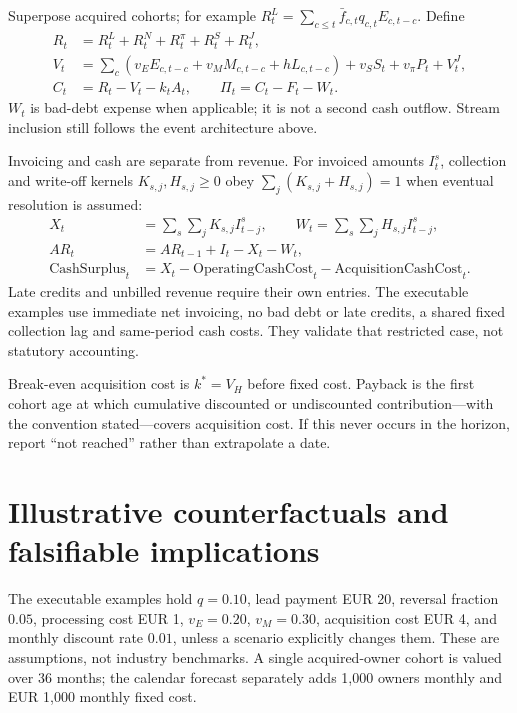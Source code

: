 \documentclass[11pt,a4paper]{article}
\begin{document}
Superpose acquired cohorts; for example $R_t^L=\sum_{c\leq t}\bar f_{c,t}q_{c,t}E_{c,t-c}$. Define
\begin{align}
 R_t&=R_t^{L}+R_t^{N}+R_t^{\pi}+R_t^{S}+R_t^{J},\\
 V_t&=\sum_c(v_EE_{c,t-c}+v_MM_{c,t-c}+hL_{c,t-c})
       +v_SS_t+v_\pi P_t+V_t^{J},\\
 C_t&=R_t-V_t-k_tA_t,\qquad \Pi_t=C_t-F_t-W_t.
\end{align}
$W_t$ is bad-debt expense when applicable; it is not a second cash outflow. Stream inclusion still follows the event architecture above.

Invoicing and cash are separate from revenue. For invoiced amounts $I^s_t$, collection and write-off kernels $K_{s,j},H_{s,j}\geq0$ obey $\sum_j(K_{s,j}+H_{s,j})=1$ when eventual resolution is assumed:
\begin{align}
 X_t&=\sum_s\sum_j K_{s,j}I^s_{t-j},\qquad
 W_t=\sum_s\sum_jH_{s,j}I^s_{t-j},\\
 AR_t&=AR_{t-1}+I_t-X_t-W_t,\\
 \mathrm{CashSurplus}_t&=X_t-\mathrm{OperatingCashCost}_t
                         -\mathrm{AcquisitionCashCost}_t.
\end{align}
Late credits and unbilled revenue require their own entries. The executable examples use immediate net invoicing, no bad debt or late credits, a shared fixed collection lag and same-period cash costs. They validate that restricted case, not statutory accounting.

Break-even acquisition cost is $k^*=V_H$ before fixed cost. Payback is the first cohort age at which cumulative discounted or undiscounted contribution---with the convention stated---covers acquisition cost. If this never occurs in the horizon, report ``not reached'' rather than extrapolate a date.

\section{Illustrative counterfactuals and falsifiable implications}

The executable examples hold $q=0.10$, lead payment EUR 20, reversal fraction $0.05$, processing cost EUR 1, $v_E=0.20$, $v_M=0.30$, acquisition cost EUR 4, and monthly discount rate $0.01$, unless a scenario explicitly changes them. These are assumptions, not industry benchmarks. A single acquired-owner cohort is valued over 36 months; the calendar forecast separately adds 1,000 owners monthly and EUR 1,000 monthly fixed cost.
\end{document}
